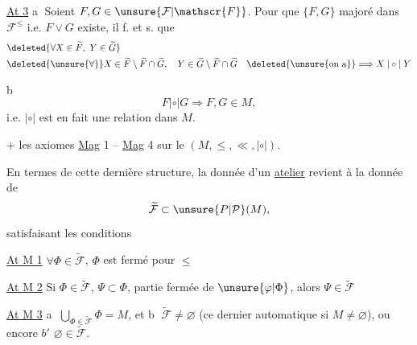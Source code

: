  

\uline{At 3} \textcircled{a} Soient $F,G\in\unsure{\mathcal{F}|\mathscr{F}}$. Pour que $\{F,G\}$ majoré dans $\mathcal{F}^{\leq}$ i.e. $F\vee G$ existe, il f. et s. que
\[
\begin{aligned}
&\deleted{\forall X\in\widetilde{F},\ Y\in\widetilde{G}}\\
&\deleted{\unsure{\forall}}X\in\widetilde{F}\setminus\widetilde{F}\cap\widetilde{G},\quad Y\in\widetilde{G}\setminus\widetilde{F}\cap\widetilde{G}\quad\deleted{\unsure{\text{on a}}}\Longrightarrow X\mathrel{|\circ|}Y
\end{aligned}
\]
\par
\textcircled{b} 
\[
F\mathrel{|\circ|}G\Longrightarrow F,G\in M,
\]
i.e. $|\circ|$ est en fait une relation dans $M$.


$+$ les axiomes \uline{Mag} 1 -- \uline{Mag} 4 sur le $(M,\leq,\ll,|\circ|)$.

En termes de cette dernière structure, la donnée d'un \uline{atelier} revient à la donnée de
\[
\widetilde{\mathcal{F}}\subset\unsure{P|\mathcal{P}}(M),
\]
satisfaisant les conditions

\uline{At M 1} $\forall\Phi\in\widetilde{\mathcal{F}}$, $\Phi$ est fermé pour $\leq$

\uline{At M 2} Si $\Phi\in\widetilde{\mathcal{F}}$, $\Psi\subset\Phi$,  partie fermée de $\unsure{\varphi|\Phi}$, alors $\Psi\in\widetilde{\mathcal{F}}$

\uline{At M 3} \textcircled{a} $\displaystyle\bigcup_{\Phi\in\widetilde{\mathcal{F}}}\Phi=M$, et \textcircled{b} $\widetilde{\mathcal{F}}\ne\varnothing$ (ce dernier automatique si $M\ne\varnothing$), ou encore \textcircled{$b'$} $\varnothing\in\widetilde{\mathcal{F}}$.
